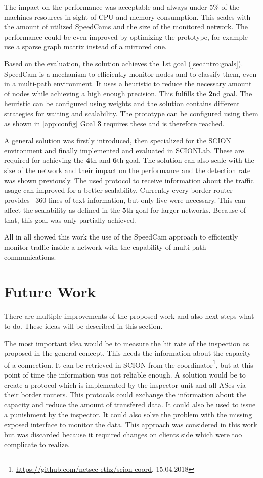 \documentclass[thesis.tex]{subfiles}
\begin{document}
The impact on the performance was acceptable and always under 5\% of the machines resources in sight of CPU and memory consumption. This scales with the amount of utilized SpeedCams and the size of the monitored network. The performance could be even improved by optimizing the prototype, for example use a sparse graph matrix instead of a mirrored one. 

Based on the evaluation, the solution achieves the \textbf{1}st goal (\autoref{sec:intro:goals}). SpeedCam is a mechanism to efficiently monitor nodes and to classify them, even in a multi-path environment. It uses a heuristic to reduce the necessary amount of nodes while achieving a high enough precision. This fulfills the \textbf{2}nd goal. The heuristic can be configured using weights and the solution contains different strategies for waiting and scalability. The prototype can be configured using them as shown in \autoref{app:config} Goal \textbf{3} requires these and is therefore reached.

A general solution was firstly introduced, then specialized for the SCION environment and finally implemented and evaluated in SCIONLab. These are required for achieving the \textbf{4}th and \textbf{6}th goal. The solution can also scale with the size of the network and their impact on the performance and the detection rate was shown previously. The used protocol to receive information about the traffic usage can improved for a better scalability. Currently every border router provides ~360 lines of text information, but only five were necessary. This can affect the scalability as defined in the \textbf{5}th goal for larger networks. Because of that, this goal was only partially achieved.

All in all showed this work the use of the SpeedCam approach to efficiently monitor traffic inside a network with the capability of multi-path communications.

\section{Future Work} \label{sec:concl:future}
There are multiple improvements of the proposed work and also next steps what to do. These ideas will be described in this section.

The most important idea would be to measure the hit rate of the inspection as proposed in the general concept. This needs the information about the capacity of a connection. It can be retrieved in SCION from the coordinator\footnote{\url{https://github.com/netsec-ethz/scion-coord}, 15.04.2018}, but at this point of time the information was not reliable enough. A solution would be to create a protocol which is implemented by the inspector unit and all ASes via their border routers. This protocols could exchange the information about the capacity and reduce the amount of transfered data. It could also be used to issue a punishment by the inspector. It could also solve the problem with the missing exposed interface to monitor the data. This approach was considered in this work but was discarded because it required changes on clients side which were too complicate to realize.
\end{document}
